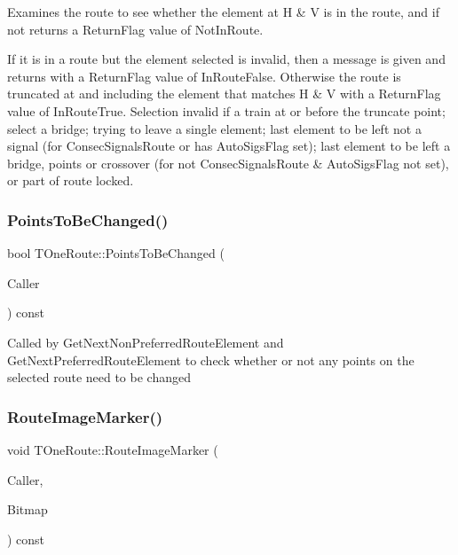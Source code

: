 Examines the route to see whether the element at H \& V is in the route, and if not returns a Return\+Flag value of Not\+In\+Route.

If it is in a route but the element selected is invalid, then a message is given and returns with a Return\+Flag value of In\+Route\+False. Otherwise the route is truncated at and including the element that matches H \& V with a Return\+Flag value of In\+Route\+True. Selection invalid if a train at or before the truncate point; select a bridge; trying to leave a single element; last element to be left not a signal (for Consec\+Signals\+Route or has Auto\+Sigs\+Flag set); last element to be left a bridge, points or crossover (for not Consec\+Signals\+Route \& Auto\+Sigs\+Flag not set), or part of route locked. \mbox{\label{class_t_one_route_a077235e61d88fb865f5f9eaf09f275e6}} 
\subsubsection{\texorpdfstring{Points\+To\+Be\+Changed()}{PointsToBeChanged()}}
{\footnotesize\ttfamily bool T\+One\+Route\+::\+Points\+To\+Be\+Changed (\begin{DoxyParamCaption}\item[{int}]{Caller }\end{DoxyParamCaption}) const}

Called by Get\+Next\+Non\+Preferred\+Route\+Element and Get\+Next\+Preferred\+Route\+Element to check whether or not any points on the selected route need to be changed \mbox{\label{class_t_one_route_aa36c801460b594ec96af1779d633d739}} 
\subsubsection{\texorpdfstring{Route\+Image\+Marker()}{RouteImageMarker()}}
{\footnotesize\ttfamily void T\+One\+Route\+::\+Route\+Image\+Marker (\begin{DoxyParamCaption}\item[{int}]{Caller,  }\item[{Graphics\+::\+T\+Bitmap $\ast$}]{Bitmap }\end{DoxyParamCaption}) const}

